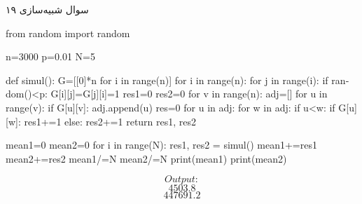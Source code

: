 سوال شبیه‌سازی ۱۹

\begin{latin}
\begin{python}
from random import random

n=3000
p=0.01
N=5

def simul():
	G=[[0]*n for i in range(n)]
	for i in range(n):
		for j in range(i):
			if random()<p:
				G[i][j]=G[j][i]=1
	res1=0
	res2=0
	for v in range(n):
		adj=[]
		for u in range(v):
			if G[u][v]:
				adj.append(u)
		res=0
		for u in adj:
			for w in adj:
				if u<w:
					if G[u][w]:
						res1+=1
					else:
						res2+=1
	return res1, res2

mean1=0
mean2=0
for i in range(N):
	res1, res2 = simul()
	mean1+=res1
	mean2+=res2
mean1/=N
mean2/=N
print(mean1)
print(mean2)
\end{python}
\end{latin}

$$
Output: 
$$
$$4503.8$$
$$447691.2$$